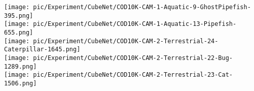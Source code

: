 \documentclass{ecai}
\begin{document}
\begin{figure*}[t]
{\begin{minipage}[t]{0.1\textwidth}
			\vspace{0.01\linewidth}
                \texttt{[image: pic/Experiment/CubeNet/COD10K-CAM-1-Aquatic-9-GhostPipefish-395.png]}\\
			\vspace{0.01\linewidth}
			\texttt{[image: pic/Experiment/CubeNet/COD10K-CAM-1-Aquatic-13-Pipefish-655.png]}\\
			\vspace{0.01\linewidth}
			\texttt{[image: pic/Experiment/CubeNet/COD10K-CAM-2-Terrestrial-24-Caterpillar-1645.png]}\\
			\vspace{0.01\linewidth}
                \texttt{[image: pic/Experiment/CubeNet/COD10K-CAM-2-Terrestrial-22-Bug-1289.png]}\\
                \vspace{0.01\linewidth}
			\texttt{[image: pic/Experiment/CubeNet/COD10K-CAM-2-Terrestrial-23-Cat-1506.png]}\\
			\vspace{0.08\linewidth}
		\end{minipage}%
	}\hspace{0.018\columnwidth}
\end{figure*}
\end{document}
